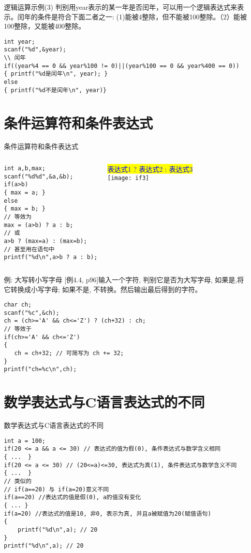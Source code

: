 \begin{frame}{逻辑运算示例(3)}
判别用year表示的某一年是否闰年，可以用一个逻辑表达式来表示。闰年的条件是符合下面二者之一: (1)能被4整除，但不能被100整除。（2）能被100整除，又能被400整除。
\begin{lstlisting}
int year;
scanf("%d",&year);
\\ 闰年
if((year%4 == 0 && year%100 != 0)||(year%100 == 0 && year%400 == 0))
{ printf("%d是闰年\n", year); }
else
{ printf("%d不是闰年\n", year)}
\end{lstlisting}
\end{frame}

\section{条件运算符和条件表达式}

\begin{frame}{条件运算符和条件表达式}
\begin{columns}[T]
\begin{lstlisting}
int a,b,max;
scanf("%d%d",&a,&b);
if(a>b)
{ max = a; }
else
{ max = b; }
// 等效为
max = (a>b) ? a : b;
// 或
a>b ? (max=a) : (max=b);
// 甚至用在语句中
printf("%d\n",a>b ? a : b);
\end{lstlisting}
\colorbox{yellow}{\textcolor{blue}{表达式1 ? 表达式2 : 表达式3}}\\
\texttt{[image: if3]}
\end{columns}
\end{frame}

\begin{frame}{例: 大写转小写字母}
[例4.4, p96]输入一个字符, 判别它是否为大写字母, 如果是,将它转换成小写字母; 如果不是, 不转换。然后输出最后得到的字符。
\begin{lstlisting}
char ch;
scanf("%c",&ch);
ch = (ch>='A' && ch<='Z') ? (ch+32) : ch;
// 等效于
if(ch>='A' && ch<='Z')
{
   ch = ch+32; // 可简写为 ch += 32;
}
printf("ch=%c\n",ch);
\end{lstlisting}
\end{frame}

\section{数学表达式与C语言表达式的不同}

\begin{frame}{数学表达式与C语言表达式的不同}
\begin{lstlisting}
int a = 100;
if(20 <= a && a <= 30) // 表达式的值为假(0), 条件表达式与数学含义相同
{ ...  }
if(20 <= a <= 30) // (20<=a)<=30, 表达式为真(1), 条件表达式与数学含义不同
{ ...  }
// 类似的
// if(a==20) 与 if(a=20)意义不同
if(a==20) //表达式的值是假(0), a的值没有变化
{ ... }
if(a=20) //表达式的值是10, 非0, 表示为真, 并且a被赋值为20(赋值语句)
{
    printf("%d\n",a); // 20 
}
printf("%d\n",a); // 20 
\end{lstlisting}
\end{frame}

